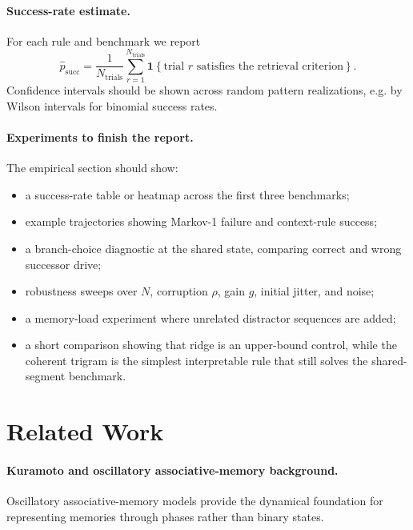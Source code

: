 \documentclass[11pt]{article}
\begin{document}
\paragraph{Success-rate estimate.}
For each rule and benchmark we report
\begin{equation}
\widehat{p}_{\mathrm{succ}}
=
\frac{1}{N_{\mathrm{trials}}}
\sum_{r=1}^{N_{\mathrm{trials}}}
\mathbf{1}\!\left\{
\text{trial } r \text{ satisfies the retrieval criterion}
\right\}.
\end{equation}
Confidence intervals should be shown across random pattern realizations, e.g. by
Wilson intervals for binomial success rates.

\paragraph{Experiments to finish the report.}
The empirical section should show:
\begin{itemize}
    \item a success-rate table or heatmap across the first three benchmarks;
    \item example trajectories showing Markov-1 failure and context-rule success;
    \item a branch-choice diagnostic at the shared state, comparing correct and
    wrong successor drive;
    \item robustness sweeps over $N$, corruption $\rho$, gain $g$, initial jitter,
    and noise;
    \item a memory-load experiment where unrelated distractor sequences are added;
    \item a short comparison showing that ridge is an upper-bound control, while
    the coherent trigram is the simplest interpretable rule that still solves the
    shared-segment benchmark.
\end{itemize}


\section{Related Work}

\paragraph{Kuramoto and oscillatory associative-memory background.}
Oscillatory associative-memory models provide the dynamical foundation for representing memories through phases rather than binary states.
\end{document}
